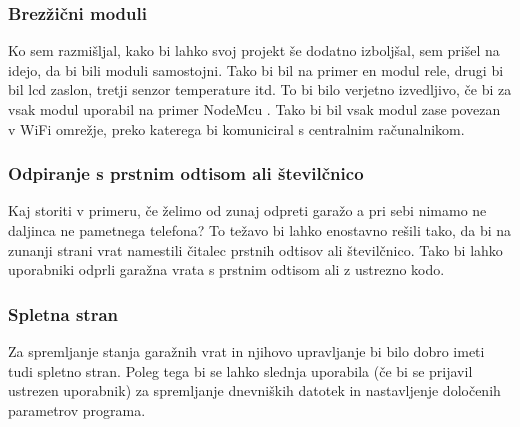 \documentclass[11pt]{article}
\begin{document}
\subsubsection{Brezžični moduli}
Ko sem razmišljal, kako bi lahko svoj projekt še dodatno izboljšal, sem prišel na idejo, da bi bili moduli samostojni. Tako bi bil na primer en modul rele, drugi bi bil \gls{lcd} zaslon, tretji senzor temperature itd.
To bi bilo verjetno izvedljivo, če bi za vsak modul uporabil na primer NodeMcu \cite{NodeMcu}. Tako bi bil vsak modul zase povezan v WiFi omrežje, preko katerega bi komuniciral s centralnim računalnikom.

\subsubsection{Odpiranje s prstnim odtisom ali številčnico}
Kaj storiti v primeru, če želimo od zunaj odpreti garažo a pri sebi nimamo ne daljinca ne pametnega telefona? To težavo bi lahko enostavno rešili tako, da bi na zunanji strani vrat namestili čitalec prstnih odtisov ali številčnico. Tako bi lahko uporabniki odprli garažna vrata s prstnim odtisom ali z ustrezno kodo.

\subsubsection{Spletna stran}
Za spremljanje stanja garažnih vrat in njihovo upravljanje bi bilo dobro imeti tudi spletno stran. Poleg tega bi se lahko slednja uporabila (če bi se prijavil ustrezen uporabnik) za spremljanje dnevniških datotek in nastavljenje določenih parametrov programa.
\newpage
\end{document}
